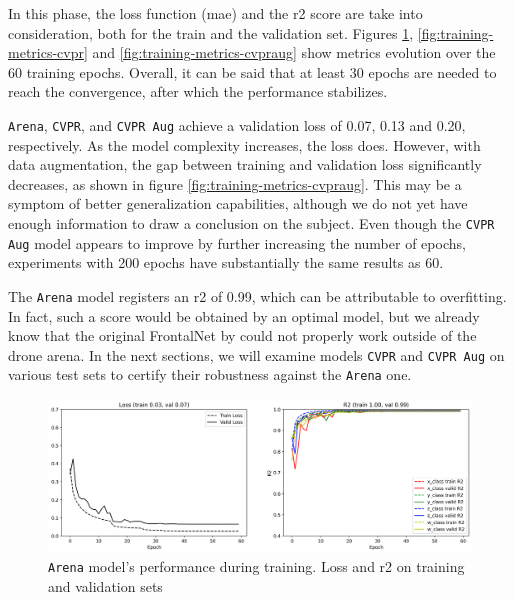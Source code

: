 In this phase, the loss function (\gls{mae}) and the \gls{r2} score are take into consideration, both for the train and the validation set. Figures \ref{fig:training-metrics-arena}, \ref{fig:training-metrics-cvpr} and \ref{fig:training-metrics-cvpraug} show metrics evolution over the 60 training epochs. Overall, it can be said that at least 30 epochs are needed to reach the convergence, after which the performance stabilizes.

\texttt{Arena}, \texttt{CVPR}, and \texttt{CVPR Aug} achieve a validation loss of 0.07, 0.13 and 0.20, respectively. As the model complexity increases, the loss does. However, with data augmentation, the gap between training and validation loss significantly decreases, as shown in figure \ref{fig:training-metrics-cvpraug}. This may be a symptom of better generalization capabilities, although we do not yet have enough information to draw a conclusion on the subject. Even though the \texttt{CVPR Aug} model appears to improve by further increasing the number of epochs, experiments with 200 epochs have substantially the same results as 60.

The \texttt{Arena} model registers an \gls{r2} of 0.99, which can be attributable to overfitting. In fact, such a score would be obtained by an optimal model, but we already know that the original FrontalNet by \cite{mantegazza2019visionbased} could not properly work outside of the drone arena. In the next sections, we will examine models \texttt{CVPR} and \texttt{CVPR Aug} on various test sets to certify their robustness against the \texttt{Arena} one.

\begin{figure}[H]
	\centering
	\includegraphics[width=1 \textwidth]{"contents/images/06-training-arena"}
	\caption[\texttt{Arena} model's performance during training. Loss and \gls{r2} on training and validation sets]{\texttt{Arena} model's performance during training. Loss and \gls{r2} on training and validation sets}
	\label{fig:training-metrics-arena}
\end{figure}


